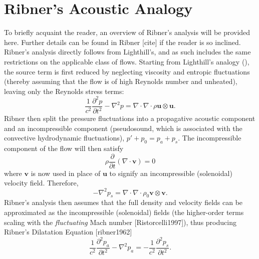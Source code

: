 \section{Ribner's Acoustic Analogy}
To briefly acquaint the reader, an overview of Ribner's analysis will be provided here.
Further details can be found in Ribner [cite] if the reader is so inclined. 
Ribner's analysis directly follows from Lighthill's, and as such includes the same restrictions on the applicable class of flows.
Starting from Lighthill's analogy (), the source term is first reduced by neglecting viscosity and entropic fluctuations (thereby assuming that the flow is of high Reynolds number and unheated), leaving only the Reynolds stress terms:
\begin{equation}
	\frac{1}{c^2}\frac{\partial^2 p}{\partial t^2} - \nabla^2 p = \nabla \cdot \nabla \cdot \rho \mathbf{u} \otimes \mathbf{u}.
\end{equation}
Ribner then split the pressure fluctuations into a propagative acoustic component and an incompressible component (pseudosound, which is associated with the convective hydrodynamic fluctuations), $p' + p_0 = p_a + p_s$. 
The incompressible component of the flow will then satisfy
\begin{equation}
	 \rho \frac{\partial}{\partial t} (\nabla \cdot \mathbf{v} )  = 0
\end{equation}
where $\mathbf{v}$ is now used in place of $\mathbf{u}$ to signify an incompressible (solenoidal) velocity field. 
Therefore, 
\begin{equation}
	- \nabla^2 p_s = \nabla \cdot \nabla \cdot \rho_0 \mathbf{v} \otimes \mathbf{v}.
\end{equation}
Ribner's analysis then assumes that the full density and velocity fields can be approximated as the incompressible (solenoidal) fields (the higher-order terms scaling with the \textit{fluctuating} Mach number [Ristorcelli1997]), thus producing Ribner's Dilatation Equation [ribner1962]
\begin{equation}
	\frac{1}{c^2}\frac{\partial^2 p_a}{\partial t^2} - \nabla^2 p_a = -\frac{1}{c^2}\frac{\partial^2 p_s}{\partial t^2}.
\end{equation} 

